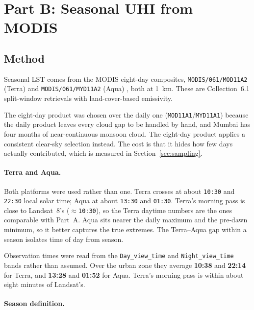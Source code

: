 \documentclass[11pt,a4paper]{article}
\begin{document}
\section{Part B: Seasonal UHI from MODIS}
\label{sec:partB}

\subsection{Method}

Seasonal LST comes from the MODIS eight-day composites,
\texttt{MODIS/061/MOD11A2} (Terra) \cite{mod11a2} and
\texttt{MODIS/061/MYD11A2} (Aqua) \cite{myd11a2}, both at
\SI{1}{\kilo\metre}. These are Collection~6.1 split-window retrievals
with land-cover-based emissivity.

The eight-day product was chosen over the daily one
(\texttt{MOD11A1}/\texttt{MYD11A1}) because the daily product leaves
every cloud gap to be handled by hand, and Mumbai has four months of
near-continuous monsoon cloud. The eight-day product applies a
consistent clear-sky selection instead. The cost is that it hides how
few days actually contributed, which is measured in
Section~\ref{sec:sampling}.

\paragraph{Terra and Aqua.}
Both platforms were used rather than one. Terra crosses at about
\texttt{10:30} and \texttt{22:30} local solar time; Aqua at about
\texttt{13:30} and \texttt{01:30}. Terra's morning pass is close to
Landsat~8's ($\approx$\texttt{10:30}), so the Terra daytime numbers
are the ones comparable with Part~A. Aqua sits nearer the daily
maximum and the pre-dawn minimum, so it better captures the true
extremes. The Terra--Aqua gap within a season isolates time of day
from season.

Observation times were read from the \texttt{Day\_view\_time} and
\texttt{Night\_view\_time} bands rather than assumed. Over the urban
zone they average \textbf{10:38} and \textbf{22:14} for Terra, and
\textbf{13:28} and \textbf{01:52} for Aqua. Terra's morning pass is
within about eight minutes of Landsat's.

\paragraph{Season definition.}
\end{document}
